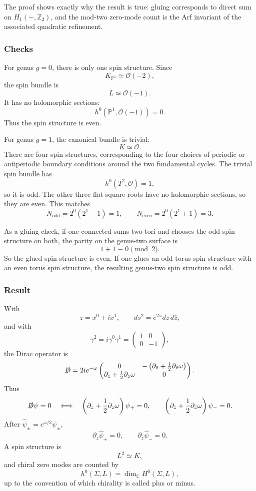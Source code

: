 \documentclass[
  10pt,
  a4paper,
  openany]{book}
\begin{document}
The proof shows exactly why the result is true: gluing corresponds to
direct sum on \(H_1(-,\mathbb Z_2)\), and the mod-two zero-mode count is
the Arf invariant of the associated quadratic refinement.

\subsubsection{Checks}\label{checks}

For genus \(g=0\), there is only one spin structure. Since \[
K_{\mathbb P^1}\simeq\mathcal O(-2),
\] the spin bundle is \[
L\simeq\mathcal O(-1).
\] It has no holomorphic sections: \[
h^0(\mathbb P^1,\mathcal O(-1))=0.
\] Thus the spin structure is even.

For genus \(g=1\), the canonical bundle is trivial: \[
K\simeq\mathcal O.
\] There are four spin structures, corresponding to the four choices of
periodic or antiperiodic boundary conditions around the two fundamental
cycles. The trivial spin bundle has \[
h^0(T^2,\mathcal O)=1,
\] so it is odd. The other three flat square roots have no holomorphic
sections, so they are even. This matches \[
N_{\text{odd}}=2^{0}(2^1-1)=1,
\qquad
N_{\text{even}}=2^{0}(2^1+1)=3.
\]

As a gluing check, if one connected-sums two tori and chooses the odd
spin structure on both, the parity on the genus-two surface is \[
1+1\equiv 0\pmod 2.
\] So the glued spin structure is even. If one glues an odd torus spin
structure with an even torus spin structure, the resulting genus-two
spin structure is odd.

\subsubsection{Result}\label{result-4}

With \[
z=x^0+ix^1,
\qquad
ds^2=e^{2\omega}dz\,d\bar z,
\] and with \[
\gamma^2=i\gamma^0\gamma^1
=
\begin{pmatrix}
1 & 0\\
0 & -1
\end{pmatrix},
\] the Dirac operator is \[
\slashed D
=
2i e^{-\omega}
\begin{pmatrix}
0 & -\left(\partial_{\bar z}+\frac{1}{2}\partial_{\bar z}\omega\right)\\
\partial_z+\frac{1}{2}\partial_z\omega & 0
\end{pmatrix}.
\] Thus \[
\slashed D\psi=0
\quad\Longleftrightarrow\quad
\left(\partial_z+\frac{1}{2}\partial_z\omega\right)\psi_+=0,
\qquad
\left(\partial_{\bar z}+\frac{1}{2}\partial_{\bar z}\omega\right)\psi_-=0.
\] After \(\widehat\psi_\pm=e^{\omega/2}\psi_\pm\), \[
\partial_z\widehat\psi_+=0,
\qquad
\partial_{\bar z}\widehat\psi_-=0.
\] A spin structure is \[
L^2\simeq K,
\] and chiral zero modes are counted by \[
h^0(\Sigma,L)=\dim_{\mathbb C} H^0(\Sigma,L),
\] up to the convention of which chirality is called plus or minus.
\end{document}
